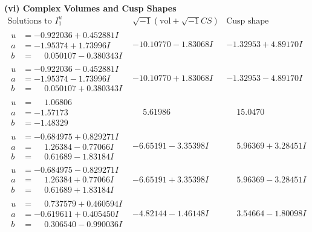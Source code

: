 \documentclass[1p]{elsarticle_modified}
\theoremstyle{definition}
\newcommand{\I}{\sqrt{-1}}
\begin{document}
\newpage\flushleft \textbf{(vi) Complex Volumes and Cusp Shapes}
$$\begin{array}{c|c|c}  
\text{Solutions to }I^u_{1}& \I (\text{vol} + \sqrt{-1}CS) & \text{Cusp shape}\\
 \hline 
\begin{aligned}
u &= -0.922036 + 0.452881 I \\
a &= -1.95374 + 1.73996 I \\
b &= \phantom{-}0.050107 - 0.380343 I\end{aligned}
 & -10.10770 - 1.83068 I & -1.32953 + 4.89170 I \\ \hline\begin{aligned}
u &= -0.922036 - 0.452881 I \\
a &= -1.95374 - 1.73996 I \\
b &= \phantom{-}0.050107 + 0.380343 I\end{aligned}
 & -10.10770 + 1.83068 I & -1.32953 - 4.89170 I \\ \hline\begin{aligned}
u &= \phantom{-}1.06806\phantom{ +0.000000I} \\
a &= -1.57173\phantom{ +0.000000I} \\
b &= -1.48329\phantom{ +0.000000I}\end{aligned}
 & \phantom{-}5.61986\phantom{ +0.000000I} & \phantom{-}15.0470\phantom{ +0.000000I} \\ \hline\begin{aligned}
u &= -0.684975 + 0.829271 I \\
a &= \phantom{-}1.26384 - 0.77066 I \\
b &= \phantom{-}0.61689 - 1.83184 I\end{aligned}
 & -6.65191 - 3.35398 I & \phantom{-}5.96369 + 3.28451 I \\ \hline\begin{aligned}
u &= -0.684975 - 0.829271 I \\
a &= \phantom{-}1.26384 + 0.77066 I \\
b &= \phantom{-}0.61689 + 1.83184 I\end{aligned}
 & -6.65191 + 3.35398 I & \phantom{-}5.96369 - 3.28451 I \\ \hline\begin{aligned}
u &= \phantom{-}0.737579 + 0.460594 I \\
a &= -0.619611 + 0.405450 I \\
b &= \phantom{-}0.306540 - 0.990036 I\end{aligned}
 & -4.82144 - 1.46148 I & \phantom{-}3.54664 - 1.80098 I \\ \hline\begin{aligned}

\end{aligned}
\end{array}$$
\end{document}
